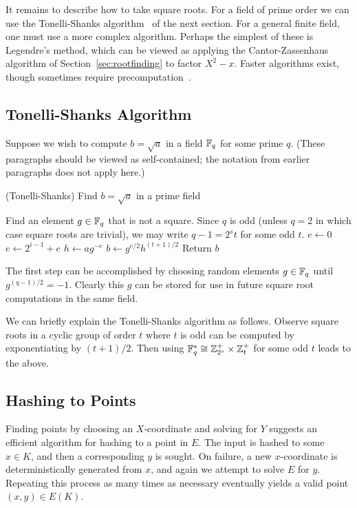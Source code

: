 It remains to describe how to take square roots. For a field of prime order we
can use the Tonelli-Shanks algorithm~\cite{bss, handbook} of the next section.
For a general finite field, one must use a more complex algorithm. Perhaps the
simplest of these is Legendre's method, which can be viewed as applying the
Cantor-Zassenhaus algorithm of Section~\ref{sec:rootfinding} to factor $X^2 -
x$. Faster algorithms exist, though sometimes require precomputation~\cite{djb}.

\subsection {Tonelli-Shanks Algorithm}

Suppose we wish to compute $b = \sqrt{a}$ in a field $\mathbb{F}_q$ for some prime $q$.
(These paragraphs should be viewed as self-contained; the notation from earlier
paragraphs does not apply here.)

\begin{algorithm}
\caption{(Tonelli-Shanks) Find $b =\sqrt{a}$ in a prime field}
\begin{algorithmic}[1]
\STATE Find an element $g \in \mathbb{F}_q$ that is not a square.
\STATE Since $q$ is odd (unless $q = 2$ in which case square roots are trivial),
we may write $q - 1 = 2^s t$ for some odd $t$.
\STATE $e \gets 0$
\STATE $e \gets 2^{i-1} + e$
\ENDIF
\ENDFOR
\STATE $h \gets ag^{-e}$
\STATE $b \gets g^{e/2} h^{(t+1)/2}$
\STATE Return $b$
\end{algorithmic}
\end{algorithm}

The first step can be accomplished by choosing random elements $g \in\mathbb{F}_q$ until
$g^{(q-1)/2} = -1$. Clearly this $g$ can be stored for use in future square
root computations in the same field.

We can briefly explain the Tonelli-Shanks algorithm as follows.
Observe square roots in a cyclic group of order $t$ where $t$ is odd can be
computed by exponentiating by $(t+1)/2$.
Then using $\mathbb{F}_q^* \cong \mathbb{Z}_{2^s}^+
\times \mathbb{Z}_t^+$ for some odd $t$ leads to the above.

\subsection {Hashing to Points}

Finding points by choosing an $X$-coordinate and solving for $Y$
suggests an efficient algorithm for hashing to a point in $E$.
The input is hashed to some $x \in K$, and then a corresponding $y$ is sought.
On failure, a new $x$-coordinate is deterministically generated from $x$,
and again we attempt to solve $E$ for $y$. Repeating this process as many
times as necessary eventually yields a valid point $(x,y) \in E(K)$.

